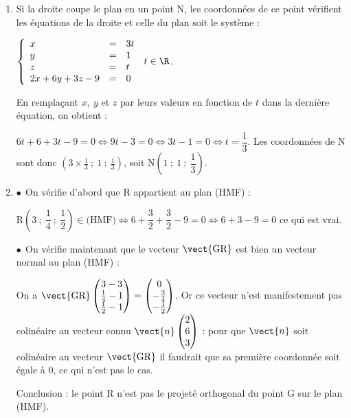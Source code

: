 \begin{enumerate}
On sait que :

$X(x~;~y~;~z) \in  (\text{DG}) \iff \vect{\text{DX}} = t\vect{\text{DG}}, \: t \in \R \iff \left\{\begin{array}{l c l}
x - 0&=&3t\\y - 1&=&0\\z - 0 &=& 1t\end{array}\right.\: t \in \R \iff \left\{\begin{array}{l c l}
x &=&3t\\y &=&1\\z  &=& t\end{array}\right.\: t \in \R$.
\item %

Si la droite coupe le plan en un point N, les coordonnées de ce point vérifient les équations de la droite et celle du plan soit le système :

$\left\{\begin{array}{l c l}
x &=&3t\\y &=&1\\z  &=& t\\
2x + 6y + 3z - 9 &= &0
\end{array}\right.\: t \in \R$.

En remplaçant $x,\:y$ et $z$ par leurs valeurs en fonction de $t$ dans la dernière équation, on obtient :

$6t + 6 + 3t - 9 = 0 \iff 9t - 3 = 0 \iff 3t - 1 = 0 \iff t = \dfrac 13$.
Les coordonnées de N sont donc $\left(3\times \frac13~;~1~;~\frac13\right)$, soit 
N$\left(1~;~1~;~\dfrac13\right)$.
\item %
$\bullet~~$On vérifie d'abord que R appartient au plan (HMF) :

$\text{R}\left(3~;~\dfrac{1}{4}~;~\dfrac{1}{2}\right) \in \text{(HMF)} \iff 6 + \dfrac32 + \dfrac32 - 9 = 0 \iff 6 + 3 - 9 = 0$ ce qui est vrai.

$\bullet~~$On vérifie maintenant que le vecteur $\vect{\text{GR}}$ est bien un vecteur normal au plan (HMF) :

On a $\vect{\text{GR}}\begin{pmatrix}3 - 3\\ \frac14 - 1\\ \frac12 - 1\end{pmatrix} = \begin{pmatrix}0\\- \frac34\\- \frac12\end{pmatrix}$.
Or ce vecteur n'est manifestement pas colinéaire au vecteur connu $\vect{n}\begin{pmatrix}2\\6\\3\end{pmatrix}$ : pour que $\vect{n}$ soit colinéaire au vecteur $\vect{\text{GR}}$ il faudrait que sa première coordonnée soit égale à 0, ce qui n'est pas le cas.

Conclusion : le point R n'est pas le projeté orthogonal du point G sur le plan (HMF).
\end{enumerate}

